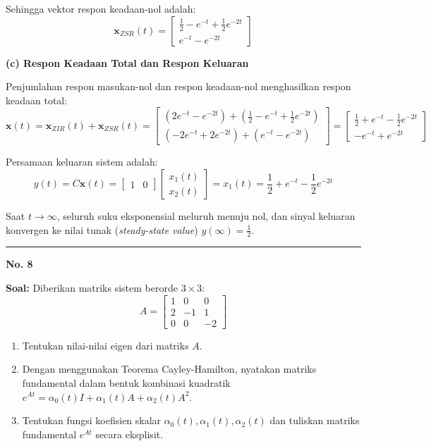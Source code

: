 \documentclass[11pt,a4paper]{article}
\begin{document}
Sehingga vektor respon keadaan-nol adalah:
$$\mathbf{x}_{ZSR}(t) = \begin{bmatrix} \frac{1}{2} - e^{-t} + \frac{1}{2}e^{-2t} \\ e^{-t} - e^{-2t} \end{bmatrix}$$

\textbf{(c) Respon Keadaan Total dan Respon Keluaran}

Penjumlahan respon masukan-nol dan respon keadaan-nol menghasilkan respon keadaan total:
$$\mathbf{x}(t) = \mathbf{x}_{ZIR}(t) + \mathbf{x}_{ZSR}(t) = \begin{bmatrix} (2e^{-t} - e^{-2t}) + (\frac{1}{2} - e^{-t} + \frac{1}{2}e^{-2t}) \\ (-2e^{-t} + 2e^{-2t}) + (e^{-t} - e^{-2t}) \end{bmatrix} = \begin{bmatrix} \frac{1}{2} + e^{-t} - \frac{1}{2}e^{-2t} \\ -e^{-t} + e^{-2t} \end{bmatrix}$$

Persamaan keluaran sistem adalah:
$$y(t) = C \mathbf{x}(t) = \begin{bmatrix} 1 & 0 \end{bmatrix} \begin{bmatrix} x_1(t) \\ x_2(t) \end{bmatrix} = x_1(t) = \frac{1}{2} + e^{-t} - \frac{1}{2}e^{-2t}$$

Saat $t \to \infty$, seluruh suku eksponensial meluruh menuju nol, dan sinyal keluaran konvergen ke nilai tunak (\textit{steady-state value}) $y(\infty) = \frac{1}{2}$.

\vspace{12pt}
\hrule
\vspace{10pt}

\textbf{\large No. 8}

\textbf{Soal:}  
Diberikan matriks sistem berorde $3 \times 3$:
$$A = \begin{bmatrix} 1 & 0 & 0 \\ 2 & -1 & 1 \\ 0 & 0 & -2 \end{bmatrix}$$
\begin{enumerate}[label=(\alph*)]
    \item Tentukan nilai-nilai eigen dari matriks $A$.
    \item Dengan menggunakan Teorema Cayley-Hamilton, nyatakan matriks fundamental dalam bentuk kombinasi kuadratik $e^{At} = \alpha_0(t) I + \alpha_1(t) A + \alpha_2(t) A^2$.
    \item Tentukan fungsi koefisien skalar $\alpha_0(t), \alpha_1(t), \alpha_2(t)$ dan tuliskan matriks fundamental $e^{At}$ secara eksplisit.
\end{enumerate}
\end{document}
